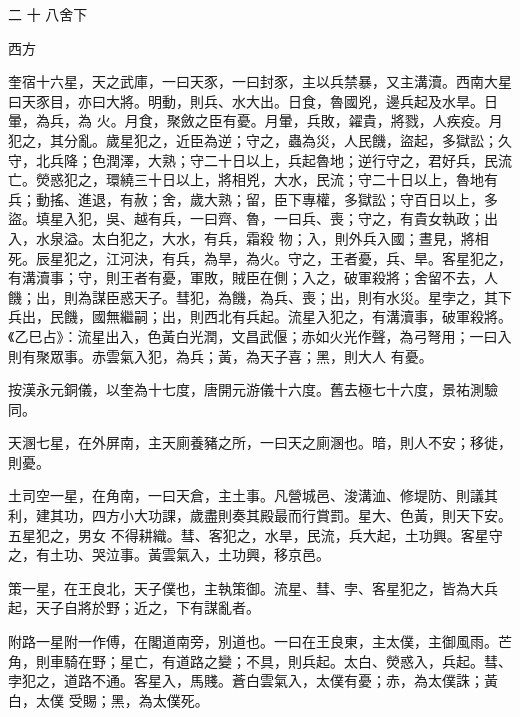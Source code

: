 
\begin{pinyinscope}

 二
 十
 八舍下



 西方



 奎宿十六星，天之武庫，一曰天豕，一曰封豕，主以兵禁暴，又主溝瀆。西南大星曰天豕目，亦曰大將。明動，則兵、水大出。日食，魯國兇，邊兵起及水旱。日暈，為兵，為
 火。月食，聚斂之臣有憂。月暈，兵敗，糴貴，將戮，人疾疫。月犯之，其分亂。歲星犯之，近臣為逆；守之，蟲為災，人民饑，盜起，多獄訟；久守，北兵降；色潤澤，大熟；守二十日以上，兵起魯地；逆行守之，君好兵，民流亡。熒惑犯之，環繞三十日以上，將相兇，大水，民流；守二十日以上，魯地有兵；動搖、進退，有赦；舍，歲大熟；留，臣下專權，多獄訟；守百日以上，多盜。填星入犯，吳、越有兵，一曰齊、魯，一曰兵、喪；守之，有貴女執政；出入，水泉溢。太白犯之，大水，有兵，霜殺
 物；入，則外兵入國；晝見，將相死。辰星犯之，江河決，有兵，為旱，為火。守之，王者憂，兵、旱。客星犯之，有溝瀆事；守，則王者有憂，軍敗，賊臣在側；入之，破軍殺將；舍留不去，人饑；出，則為謀臣惑天子。彗犯，為饑，為兵、喪；出，則有水災。星孛之，其下兵出，民饑，國無繼嗣；出，則西北有兵起。流星入犯之，有溝瀆事，破軍殺將。《乙巳占》：流星出入，色黃白光潤，文昌武偃；赤如火光作聲，為弓弩用；一曰入則有聚眾事。赤雲氣入犯，為兵；黃，為天子喜；黑，則大人
 有憂。



 按漢永元銅儀，以奎為十七度，唐開元游儀十六度。舊去極七十六度，景祐測驗同。



 天溷七星，在外屏南，主天廁養豬之所，一曰天之廁溷也。暗，則人不安；移徙，則憂。



 土司空一星，在角南，一曰天倉，主土事。凡營城邑、浚溝洫、修堤防、則議其利，建其功，四方小大功課，歲盡則奏其殿最而行賞罰。星大、色黃，則天下安。五星犯之，男女
 不得耕織。彗、客犯之，水旱，民流，兵大起，土功興。客星守之，有土功、哭泣事。黃雲氣入，土功興，移京邑。



 策一星，在王良北，天子僕也，主執策御。流星、彗、孛、客星犯之，皆為大兵起，天子自將於野；近之，下有謀亂者。



 附路一星附一作傅，在閣道南旁，別道也。一曰在王良東，主太僕，主御風雨。芒角，則車騎在野；星亡，有道路之變；不具，則兵起。太白、熒惑入，兵起。彗、孛犯之，道路不通。客星入，馬賤。蒼白雲氣入，太僕有憂；赤，為太僕誅；黃白，太僕
 受賜；黑，為太僕死。




\end{pinyinscope}
